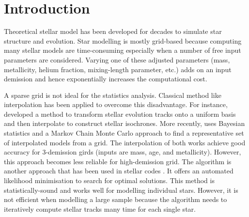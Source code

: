 \section{Introduction}

Theoretical stellar model has been developed for decades to simulate star structure and evolution. Star modelling is mostly grid-based \citep[e.g.][]{2016ApJ...823..102C} because computing many stellar models are time-consuming especially when a number of free input parameters are considered. Varying one of these adjusted parameters (mass, metallicity, helium fraction, mixing-length parameter, etc.) adds on an input demission and hence exponentially increases the computational cost. 

A sparse grid is not ideal for the statistics analysis. Classical method like interpolation has been applied to overcome this disadvantage. For instance, \citet{2016ApJS..222....8D} developed a method to transform stellar evolution tracks onto a uniform basis and then interpolate to construct stellar isochrones. More recently, \citet{2019MNRAS.484..771R} uses Bayesian statistics and a Markov Chain Monte Carlo approach to find a representative set of interpolated models from a grid. The interpolation of both works achieve good accuracy for 3-demission girds (inputs are mass, age, and metallicity). However, this approach becomes less reliable for high-demission grid. The algorithm is another approach that has been used in stellar codes \citep[e.g. the \textsc{MESA Simplex} module][]{2013ApJS..208....4P}. It offers an automated likelihood minimisation to search for optimal solutions. This method is statistically-sound and works well for modelling individual stars. However, it is not efficient when modelling a large sample because the algorithm needs to iteratively compute stellar tracks many time for each single star.  

